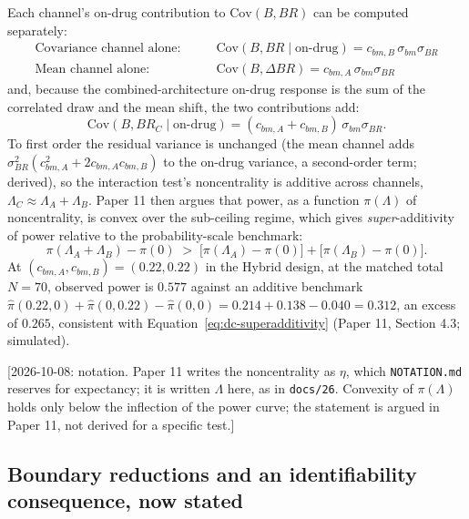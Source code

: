 \documentclass[11pt]{article}
\newcommand{\note}[1]{\textcolor{blue!60!black}{\small [#1]}}
\newcommand{\code}[1]{\texttt{#1}}
\begin{document}
Each channel's on-drug contribution to $\mathrm{Cov}(B, BR)$ can be
computed separately:
\begin{align}
\text{Covariance channel alone:} \qquad &
  \mathrm{Cov}(B, BR \mid \text{on-drug}) = c_{bm,B}\,\sigma_{bm}\sigma_{BR}
  \label{eq:dc-covB} \\
\text{Mean channel alone:} \qquad &
  \mathrm{Cov}(B, \Delta BR) = c_{bm,A}\,\sigma_{bm}\sigma_{BR}
  \label{eq:dc-covA}
\end{align}
and, because the combined-architecture on-drug response is the sum of
the correlated draw and the mean shift, the two contributions add:
\begin{equation}
\mathrm{Cov}(B, BR_C \mid \text{on-drug}) = (c_{bm,A} +
  c_{bm,B})\,\sigma_{bm}\sigma_{BR}.
\label{eq:dc-covC}
\end{equation}
To first order the residual variance is unchanged (the mean channel
adds $\sigma_{BR}^2(c_{bm,A}^2 + 2c_{bm,A}c_{bm,B})$ to the on-drug
variance, a second-order term; derived), so the interaction test's
noncentrality is additive across channels, $\Lambda_C \approx \Lambda_A
+ \Lambda_B$. Paper 11 then argues that power, as a function
$\pi(\Lambda)$ of noncentrality, is convex over the sub-ceiling regime,
which gives \emph{super}-additivity of power relative to the
probability-scale benchmark:
\begin{equation}
\pi(\Lambda_A + \Lambda_B) - \pi(0) \; > \;
  \big[\pi(\Lambda_A) - \pi(0)\big] + \big[\pi(\Lambda_B) - \pi(0)\big].
\label{eq:dc-superadditivity}
\end{equation}
At $(c_{bm,A}, c_{bm,B}) = (0.22, 0.22)$ in the Hybrid design, at the
matched total $N=70$, observed power is $0.577$ against an additive
benchmark $\hat\pi(0.22,0)+\hat\pi(0,0.22)-\hat\pi(0,0) =
0.214+0.138-0.040 = 0.312$, an excess of $0.265$, consistent with
Equation~\eqref{eq:dc-superadditivity} (Paper 11, Section 4.3;
simulated).

\note{2026-10-08: notation. Paper 11 writes the noncentrality as
$\eta$, which \code{NOTATION.md} reserves for expectancy; it is written
$\Lambda$ here, as in \code{docs/26}. Convexity of $\pi(\Lambda)$ holds
only below the inflection of the power curve; the statement is
argued in Paper 11, not derived for a specific test.}

\subsection{Boundary reductions and an identifiability consequence,
now stated}
\end{document}
